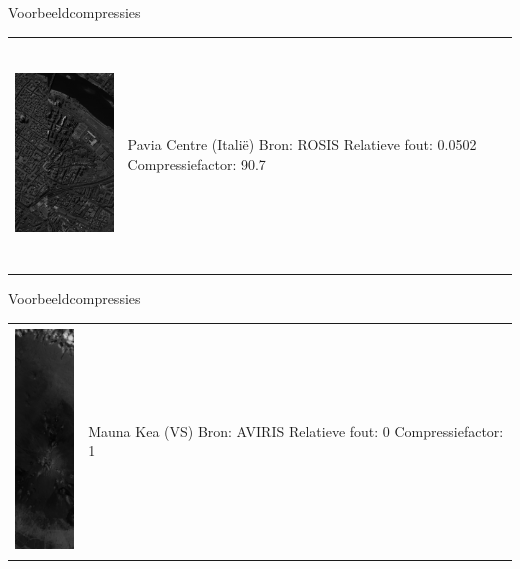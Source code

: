 \documentclass[t,12pt,dutch
\ifx\beamermode\undefined\else,\beamermode\fi
]{beamer}
\begin{document}
\begin{frame}{Voorbeeldcompressies}

\begin{table}[H]
\centering
\begin{tabular}{C{0.6\textwidth}  L{0.4\textwidth}}
\includegraphics[height=6cm]{images/example_compression_Pavia_Centre_0_05.png}
&
Pavia Centre (Itali\"e)\newline
Bron: ROSIS \cite{ref:ehu_rosis_pavia_centre}\newline
\vspace{5mm}
Relatieve fout: 0.0502
Compressiefactor: 90.7
\end{tabular}
\end{table}

\end{frame}

\begin{frame}{Voorbeeldcompressies}

\begin{table}[H]
\centering
\begin{tabular}{C{0.6\textwidth}  L{0.4\textwidth}}
\includegraphics[height=6cm]{images/mauna_kea_sum.png}
&
Mauna Kea (VS)\newline
Bron: AVIRIS \cite{ref:aviris}\newline
\vspace{5mm}
Relatieve fout: 0
Compressiefactor: 1
\end{tabular}
\end{table}

\end{frame}
\end{document}
